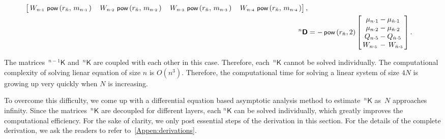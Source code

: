 \documentclass[preprint,12pt,times]{elsarticle}
\newcommand{\minus}[1]{\check{#1}}
\numberwithin{equation}{section}
\renewcommand{\u}[1]{\boldsymbol{#1}}
\newcommand{\usf}[1]{\u{\mathsf #1}}
\newcommand{\pr}[1]{\left( #1 \right)}
\newcommand{\p}{\,\textsf{\small pow}}
\newcommand{\msub}[2]{
\IfEqCase{#2}{
      {i}{\, m_{#1\cdot #2}\,}%
  }[\,m_{#1\cdot {\scriptscriptstyle #2}}\,]}
\newcommand{\Qsub}[2]{Q_{#1\cdot #2}}
\newcommand{\Wsub}[2]{
\IfEqCase{#2}{
      {i}{\, W_{#1\cdot #2}\,}%
  }[\,W_{#1\cdot {\scriptscriptstyle #2}}\,]}
\newcommand{\musub}[2]{\mu_{#1\cdot #2}}
\renewcommand{\>}{$\Rightarrow$}
\begin{document}
\begin{subequations}
\begin{align}
\begin{bmatrix}
  \Wsub{n}{1} \p\pr{r_{\minus{n}},\msub{n}{1}} & \Wsub{n}{2} \p\pr{r_{\minus{n}},\msub{n}{2}} & \Wsub{n}{3} \p\pr{r_{\minus{n}},\msub{n}{3}} & \Wsub{n}{4} \p\pr{r_{\minus{n}},\msub{n}{4}}
  \end{bmatrix} , \\
~^{n}{\usf{D}} & = - \p\pr{r_{\minus{n}},2}
  \begin{bmatrix}
    \musub{n}{1}-\musub{\minus{n}}{1} \\ \musub{n}{2}-\musub{\minus{n}}{2}  \\ \Qsub{n}{5}-\Qsub{\minus{n}}{5} \\ \Wsub{n}{5}-\Wsub{\minus{n}}{5}
  \end{bmatrix}.
\end{align}
\end{subequations}

The matrices~${}^{{n-1}}{\usf{K}}$ and~${}^{n}{\usf{K}}$ are coupled with each other in this case. Therefore, each~${}^{n}{\usf{K}}$ cannot be solved individually. The computational complexity of solving lienar equation of size $n$ is $O(n^3)$. Therefore, the computational time for solving a linear system of size $4N$ is growing up very quickly when $N$ is increasing.

To overcome this difficulty, we come up with a differential equation based asymptotic analysis method to estimate~${}^{n}{\usf{K}}$ as~$N$ approaches infinity. Since the matrices~${}^{n}{\usf{K}}$ are decoupled for different layers, each ${}^{n}{\usf{K}}$ can be solved individually, which greatly improves the computational efficiency.
For the sake of clarity, we only post essential steps of the derivation in this section. For the details of the complete derivation, we ask the readers to refer to~\ref{Appen:derivations}.
\end{document}

